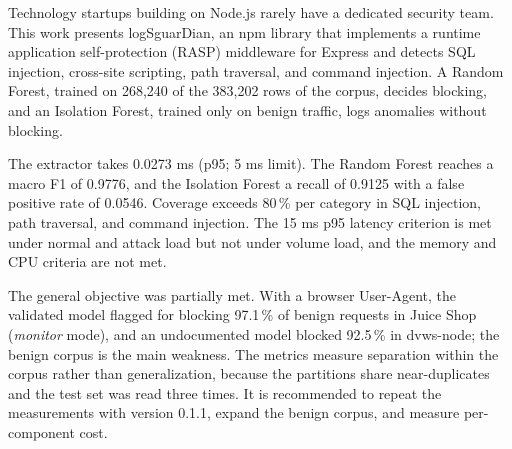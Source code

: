 Technology startups building on Node.js rarely have a dedicated security team. This work presents logSguarDian, an npm library that implements a runtime application self-protection (RASP) middleware for Express and detects SQL injection, cross-site scripting, path traversal, and command injection. A Random Forest, trained on 268,240 of the 383,202 rows of the corpus, decides blocking, and an Isolation Forest, trained only on benign traffic, logs anomalies without blocking.

The extractor takes 0.0273 ms (p95; 5 ms limit). The Random Forest reaches a macro F1 of 0.9776, and the Isolation Forest a recall of 0.9125 with a false positive rate of 0.0546. Coverage exceeds 80\,\% per category in SQL injection, path traversal, and command injection. The 15 ms p95 latency criterion is met under normal and attack load but not under volume load, and the memory and CPU criteria are not met.

The general objective was partially met. With a browser User-Agent, the validated model flagged for blocking 97.1\,\% of benign requests in Juice Shop (\textit{monitor} mode), and an undocumented model blocked 92.5\,\% in dvws-node; the benign corpus is the main weakness. The metrics measure separation within the corpus rather than generalization, because the partitions share near-duplicates and the test set was read three times. It is recommended to repeat the measurements with version 0.1.1, expand the benign corpus, and measure per-component cost.
